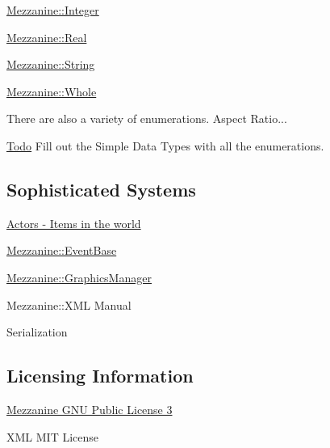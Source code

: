 \hyperlink{namespaceMezzanine_ac3576e52af3c62d13dde94829e0c5465}{Mezzanine::Integer}

\hyperlink{namespaceMezzanine_a726731b1a7df72bf3583e4a97282c6f6}{Mezzanine::Real}

\hyperlink{namespaceMezzanine_acf9fcc130e6ebf08e3d8491aebcf1c86}{Mezzanine::String}

\hyperlink{namespaceMezzanine_adcbb6ce6d1eb4379d109e51171e2e493}{Mezzanine::Whole}

\begin{DoxyParagraph}{There are also a variety of enumerations. Aspect Ratio...}

\end{DoxyParagraph}
\begin{Desc}
\item[\hyperlink{todo__todo000030}{Todo}]Fill out the Simple Data Types with all the enumerations.\end{Desc}
\hypertarget{index_Sophisticated}{}\subsection{Sophisticated Systems}\label{index_Sophisticated}
\hyperlink{classMezzanine_1_1ActorBase}{Actors -\/ Items in the world}

\hyperlink{classMezzanine_1_1EventBase}{Mezzanine::EventBase}

\hyperlink{classMezzanine_1_1GraphicsManager}{Mezzanine::GraphicsManager}

Mezzanine::XML Manual

Serialization\hypertarget{index_Licensing}{}\subsection{Licensing Information}\label{index_Licensing}
\hyperlink{GPLLicense}{Mezzanine GNU Public License 3}

XML MIT License 